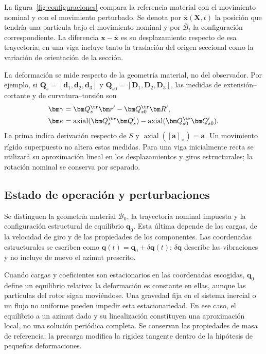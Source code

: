 La figura~\ref{fig:configuraciones} compara la referencia material con el movimiento nominal y con el movimiento perturbado. Se denota por $\overline{\bm x}(\bm X,t)$ la posición que tendría una partícula bajo el movimiento nominal y por $\overline{\mathcal B}_t$ la configuración correspondiente. La diferencia $\bm x-\overline{\bm x}$ es su desplazamiento respecto de esa trayectoria; en una viga incluye tanto la traslación del origen seccional como la variación de orientación de la sección.




La deformación se mide respecto de la geometría material, no del observador. Por ejemplo, si $\bm Q_s=[\bm d_1,\bm d_2,\bm d_3]$ y $\bm Q_{s0}=[\bm D_1,\bm D_2,\bm D_3]$, las medidas de extensión--cortante y de curvatura--torsión son
\begin{align}
\bm\gamma&=\bm Q_s^\tr\bm r'-\bm Q_{s0}^\tr\bm R',\nonumber\\
\bm\kappa&=\operatorname{axial}(\bm Q_s^\tr\bm Q_s')
-\operatorname{axial}(\bm Q_{s0}^\tr\bm Q_{s0}').
\label{eq:medidas-viga}
\end{align}
La prima indica derivación respecto de $S$ y $\operatorname{axial}([\bm a]_\times)=\bm a$. Un movimiento rígido superpuesto no altera estas medidas. Para una viga inicialmente recta se utilizará su aproximación lineal en los desplazamientos y giros estructurales; la rotación nominal se conserva por separado.

\subsection{Estado de operación y perturbaciones}
Se distinguen la geometría material $\mathcal B_0$, la trayectoria nominal impuesta y la configuración estructural de equilibrio $\bm q_0$. Esta última depende de las cargas, de la velocidad de giro y de las propiedades de los componentes. Las coordenadas estructurales se escriben como $\bm q(t)=\bm q_0+\delta\bm q(t)$; $\delta\bm q$ describe las vibraciones y no incluye de nuevo el azimut prescrito.

Cuando cargas y coeficientes son estacionarios en las coordenadas escogidas, $\bm q_0$ define un equilibrio relativo: la deformación es constante en ellas, aunque las partículas del rotor sigan moviéndose. Una gravedad fija en el sistema inercial o un flujo no uniforme pueden impedir esta estacionariedad. En ese caso, el equilibrio a un azimut dado y su linealización constituyen una aproximación local, no una solución periódica completa. Se conservan las propiedades de masa de referencia; la precarga modifica la rigidez tangente dentro de la hipótesis de pequeñas deformaciones.

